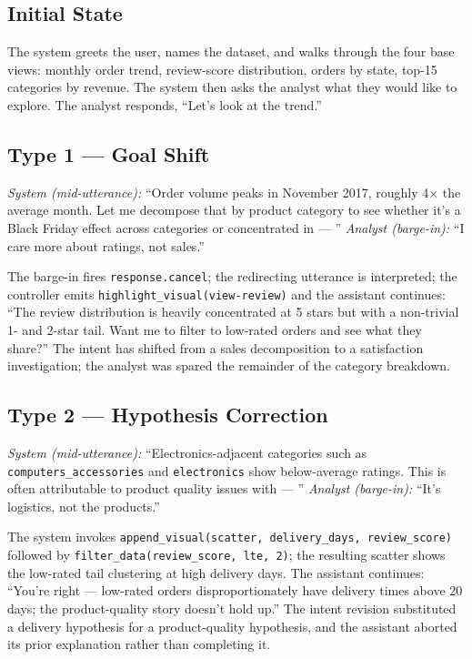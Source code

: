 \documentclass[journal]{IEEEtran}
\begin{document}
\subsection{Initial State} The system greets the user, names the dataset, and walks through the four base views: monthly order trend, review-score distribution, orders by state, top-15 categories by revenue. The system then asks the analyst what they would like to explore. The analyst responds, ``Let's look at the trend.''

\subsection{Type 1 --- Goal Shift}
\emph{System (mid-utterance):} ``Order volume peaks in November 2017, roughly 4$\times$ the average month. Let me decompose that by product category to see whether it's a Black Friday effect across categories or concentrated in --- ''
\emph{Analyst (barge-in):} ``I care more about ratings, not sales.''

The barge-in fires \texttt{response.cancel}; the redirecting utterance is interpreted; the controller emits \texttt{highlight\_visual(view-review)} and the assistant continues: ``The review distribution is heavily concentrated at 5 stars but with a non-trivial 1- and 2-star tail. Want me to filter to low-rated orders and see what they share?'' The intent has shifted from a sales decomposition to a satisfaction investigation; the analyst was spared the remainder of the category breakdown.

\subsection{Type 2 --- Hypothesis Correction}
\emph{System (mid-utterance):} ``Electronics-adjacent categories such as \texttt{computers\_accessories} and \texttt{electronics} show below-average ratings. This is often attributable to product quality issues with --- ''
\emph{Analyst (barge-in):} ``It's logistics, not the products.''

The system invokes \texttt{append\_visual(scatter, delivery\_days, review\_score)} followed by \texttt{filter\_data(review\_score, lte, 2)}; the resulting scatter shows the low-rated tail clustering at high delivery days. The assistant continues: ``You're right --- low-rated orders disproportionately have delivery times above 20 days; the product-quality story doesn't hold up.'' The intent revision substituted a delivery hypothesis for a product-quality hypothesis, and the assistant aborted its prior explanation rather than completing it.
\end{document}

